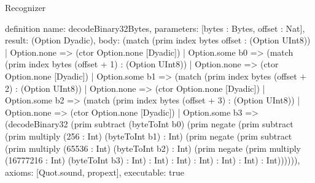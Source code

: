 \begin{lexlean}{Recognizer}
\begin{semanticmodule}
definition{
  name: decodeBinary32Bytes,
  parameters: [bytes : Bytes, offset : Nat],
  result: (Option Dyadic),
  body: (match (prim index bytes offset : (Option UInt8))
    | Option.none => (ctor Option.none [Dyadic])
    | Option.some b0 => (match (prim index bytes (offset + 1) : (Option UInt8))
      | Option.none => (ctor Option.none [Dyadic])
      | Option.some b1 => (match (prim index bytes (offset + 2) : (Option UInt8))
        | Option.none => (ctor Option.none [Dyadic])
        | Option.some b2 => (match (prim index bytes (offset + 3) : (Option UInt8))
          | Option.none => (ctor Option.none [Dyadic])
          | Option.some b3 => (decodeBinary32 (prim subtract (byteToInt b0) (prim negate (prim subtract (prim multiply (256 : Int) (byteToInt b1) : Int) (prim negate (prim subtract (prim multiply (65536 : Int) (byteToInt b2) : Int) (prim negate (prim multiply (16777216 : Int) (byteToInt b3) : Int) : Int) : Int) : Int) : Int) : Int) : Int)))))),
  axioms: [Quot.sound, propext],
  executable: true
}


\end{semanticmodule}
\end{lexlean}
